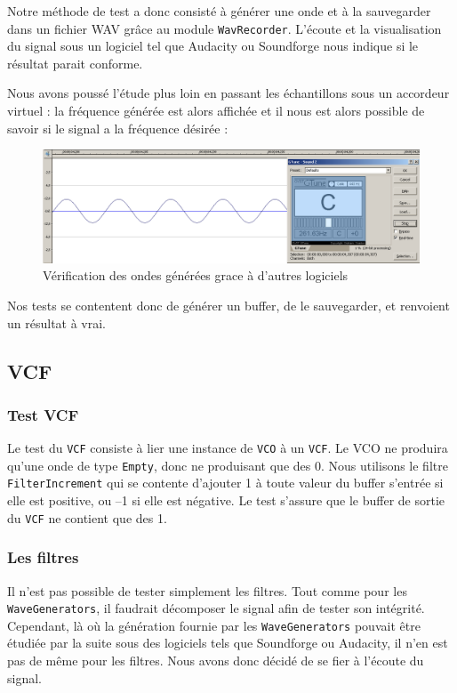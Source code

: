 Notre méthode de test a donc consisté à générer une onde et à la
sauvegarder dans un fichier WAV grâce au module \verb!WavRecorder!.
L'écoute et la visualisation du signal sous un logiciel tel que
Audacity ou Soundforge nous indique si le résultat parait
conforme.

Nous avons poussé l'étude plus loin en passant les échantillons
sous un accordeur virtuel : la fréquence générée est alors affichée
et il nous est alors possible de savoir si le signal a la fréquence
désirée :

\begin{figure}[htb]
\centering
\includegraphics[width=17cm]{../img/png/testWaveGeneratorSinus.png}
\caption{Vérification des ondes générées grace à d'autres logiciels}
\end{figure}

Nos tests se contentent donc de générer un buffer, de le
sauvegarder, et renvoient un résultat à vrai.

\subsection{VCF}

\subsubsection{Test VCF}

Le test du \verb!VCF! consiste à lier une instance de \verb!VCO! à
un \verb!VCF!. Le VCO ne produira qu'une onde de type \verb!Empty!,
donc ne produisant que des 0. Nous utilisons le filtre
\verb!FilterIncrement! qui se contente d'ajouter 1 à toute valeur
du buffer s'entrée si elle est positive, ou --1 si elle est
négative. Le test s'assure que le buffer de sortie du \verb!VCF! ne
contient que des 1.

\subsubsection{Les filtres}

Il n'est pas possible de tester simplement les filtres. Tout comme
pour les \verb!WaveGenerators!, il faudrait décomposer le signal
afin de tester son intégrité. Cependant, là où la génération
fournie par les \verb!WaveGenerators! pouvait être étudiée par la
suite sous des logiciels tels que Soundforge ou Audacity, il n'en
est pas de même pour les filtres. Nous avons donc décidé de se fier
à l'écoute du signal.

